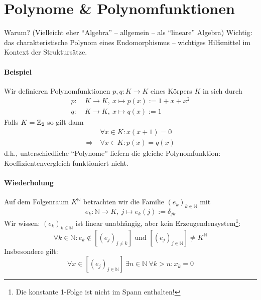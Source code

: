 \section{Polynome \& Polynomfunktionen}
	Warum? (Vielleicht eher "`Algebra"' -- allgemein -- als "`lineare"' Algebra) Wichtig: das charakteristische Polynom eines Endomorphismus -- wichtiges Hilfsmittel im Kontext der Struktursätze.
\paragraph{Beispiel}
	Wir definieren Polynomfunktionen $ p,q: K\to K $ eines Körpers $ K $ in sich durch 
		\begin{align*}
		p:\ & K\to K,\ x\mapsto p(x):= 1+x+x^2\\
		q:\ & K\to K,\ x\mapsto q(x):= 1
		\end{align*}
	Falls $ K=\mathbb{Z}_2 $ so gilt dann
		\begin{align*}
		&\forall x\in K: x(x+1)=0\\
		\Rightarrow\ &\forall x\in K: p(x) = q(x)
		\end{align*}
	d.h., unterschiedliche "`Polynome"' liefern die gleiche Polynomfunktion: Koeffizientenvergleich funktioniert nicht.
\paragraph{Wiederholung}
	Auf dem Folgenraum $ K^\mathbb{N} $ betrachten wir die Familie $ (e_k)_{k\in \mathbb{N}} $ mit
		\[ e_k :\mathbb{N}\to K,\ j\mapsto e_k(j):= \delta_{jk} \]
	Wir wissen: $ (e_k)_{k\in \mathbb{N}} $ ist linear unabhängig, aber kein Erzeugendensystem\footnote{Die konstante 1-Folge ist nicht im Spann enthalten!}:
		\[ \forall k\in \mathbb{N}: e_k \notin [(e_j)_{j\neq k}] \text{ und }
		[(e_j)_{j\in\mathbb{N}}]\neq K^{\mathbb{N}}\]
	Insbesondere gilt:
		\[ \forall x\in [(e_j)_{j\in \mathbb{N}}]\ \exists n\in \mathbb{N}\ \forall k>n : x_k = 0 \]
